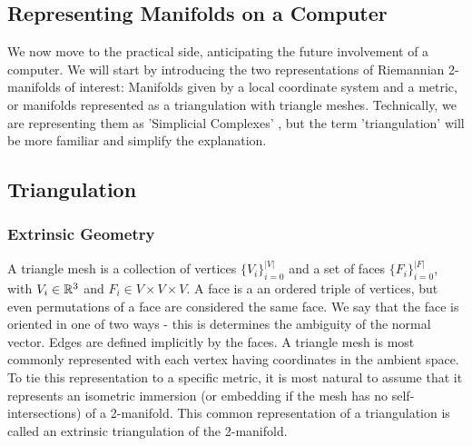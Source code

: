 \subsection*{Representing Manifolds on a Computer}
We now move to the practical side, anticipating the future involvement of a computer. We will start by introducing the two representations of Riemannian 2-manifolds of interest: Manifolds given by a local coordinate system and a metric, or manifolds represented as a triangulation with triangle meshes. Technically, we are representing them as 'Simplicial Complexes' \cite{craneDDG}, but the term 'triangulation' will be more familiar and simplify the explanation.
\subsection*{Triangulation}
\subsubsection*{Extrinsic Geometry}
A triangle mesh is a collection of vertices $\{V_i\}_{i=0}^{|V|}$ and a set of faces $\{F_i\}_{i=0}^{|F|}$, with $V_i \in \mathbb{R}^3$ and $F_i \in V \times V \times V$. A face is a an ordered triple of vertices, but even permutations of a face are considered the same face. We say that the face is oriented in one of two ways - this is determines the ambiguity of the normal vector. Edges are defined implicitly by the faces.
A triangle mesh is most commonly represented with each vertex having coordinates in the ambient space. To tie this representation to a specific metric, it is most natural to assume that it represents an isometric immersion (or embedding if the mesh has no self-intersections) of a 2-manifold. This common representation of a triangulation is called an extrinsic triangulation of the 2-manifold.
